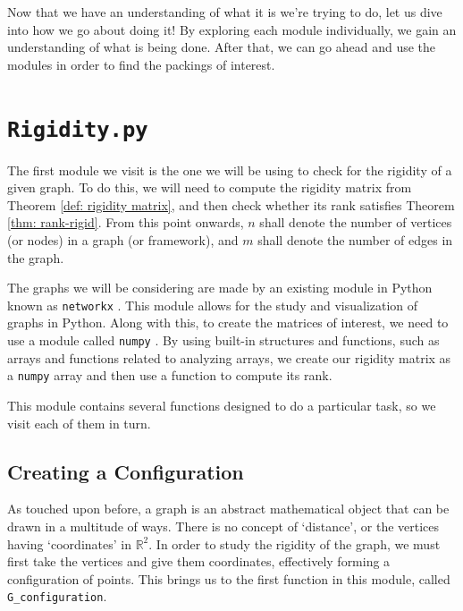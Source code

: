 \begin{flushleft}
Now that we have an understanding of what it is we're trying to do, let us dive into how we go about doing it! By exploring each module individually, we gain an understanding of what is being done. After that, we can go ahead and use the modules in order to find the packings of interest.
\end{flushleft}

\section{\texttt{Rigidity.py}}

\begin{flushleft}
The first module we visit is the one we will be using to check for the rigidity of a given graph. To do this, we will need to compute the rigidity matrix from Theorem \ref{def: rigidity matrix}, and then check whether its rank satisfies Theorem \ref{thm: rank-rigid}. From this point onwards, $n$ shall denote the number of vertices (or nodes) in a graph (or framework), and $m$ shall denote the number of edges in the graph. 
\end{flushleft}

\begin{flushleft}
The graphs we will be considering are made by an existing module in Python known as \texttt{networkx} \cite{networkx}. This module allows for the study and visualization of graphs in Python. Along with this, to create the matrices of interest, we need to use a module called \texttt{numpy} \cite{numpy}. By using built-in structures and functions, such as arrays and functions related to analyzing arrays, we create our rigidity matrix as a \texttt{numpy} array and then use a function to compute its rank.
\end{flushleft}

\begin{flushleft}
This module contains several functions designed to do a particular task, so we visit each of them in turn.
\end{flushleft}

\subsection{Creating a Configuration}

\begin{flushleft}
As touched upon before, a graph is an abstract mathematical object that can be drawn in a multitude of ways. There is no concept of `distance', or the vertices having `coordinates' in $\mathbb{R}^2$. In order to study the rigidity of the graph, we must first take the vertices and give them coordinates, effectively forming a configuration of points. This brings us to the first function in this module, called \texttt{G\_configuration}.
\end{flushleft}

